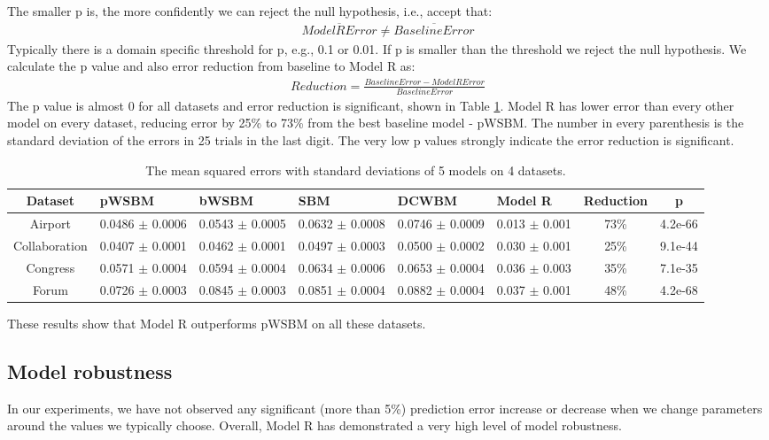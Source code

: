 \documentclass[conference]{IEEEtran}
\begin{document}
The smaller p is, the more confidently we can reject the null hypothesis, i.e., accept that:
\begin{align*}
\overline{ModelRError} \neq \overline{BaselineError}
\end{align*}
Typically there is a domain specific threshold for p, e.g., 0.1 or 0.01. If p is smaller than the threshold we reject the null hypothesis.
We calculate the p value and also error reduction from baseline to Model R as:
\begin{align*}
Reduction = \frac{BaselineError - ModelRError}{BaselineError}
\end{align*}
The p value is almost 0 for all datasets and error reduction is significant,
shown in Table \ref{tab:errors}.
Model R has lower error than every other model on every dataset,
reducing error by 25\% to 73\% from the best baseline model - pWSBM.
The number in every parenthesis is the standard deviation of the errors in 25 trials in the last digit. The very low p values strongly indicate the error reduction is significant.
\begin{table}[!htb]\centering
	\caption{
		The mean squared errors with standard deviations of 5 models on 4 datasets.
	}
	\begin{tabularx}{\textwidth}{|c|X|X|X|X|X|c|c|} \hline \rowcolor{blue!40}
		Dataset & pWSBM & bWSBM & SBM & DCWBM & Model R & Reduction & p \\ \hline
		Airport & 0.0486 $ \pm $ 0.0006 & 0.0543 $ \pm $ 0.0005 & 0.0632 $ \pm $ 0.0008 & 0.0746 $ \pm $ 0.0009 & 0.013 $ \pm $ 0.001 & 73\% & 4.2e-66 \\ \hline
		Collaboration & 0.0407 $ \pm $ 0.0001 & 0.0462 $ \pm $ 0.0001 & 0.0497 $ \pm $ 0.0003 & 0.0500 $ \pm $ 0.0002 & 0.030 $ \pm $ 0.001 & 25\% & 9.1e-44 \\ \hline
		Congress & 0.0571 $ \pm $ 0.0004 & 0.0594 $ \pm $ 0.0004 & 0.0634 $ \pm $ 0.0006 & 0.0653 $ \pm $ 0.0004 & 0.036 $ \pm $ 0.003 & 35\% & 7.1e-35 \\ \hline
		Forum & 0.0726 $ \pm $ 0.0003 & 0.0845 $ \pm $ 0.0003 & 0.0851 $ \pm $ 0.0004 & 0.0882 $ \pm $ 0.0004 & 0.037 $ \pm $ 0.001 & 48\% & 4.2e-68 \\ \hline
	\end{tabularx}
	\label{tab:errors}
\end{table}
These results show that Model R outperforms pWSBM on all these datasets.

\subsection{Model robustness}
In our experiments, we have not observed any significant (more than 5\%)
prediction error increase or decrease when we change parameters around the values
we typically choose.
Overall, Model R has demonstrated a very high level of model robustness.
\end{document}
